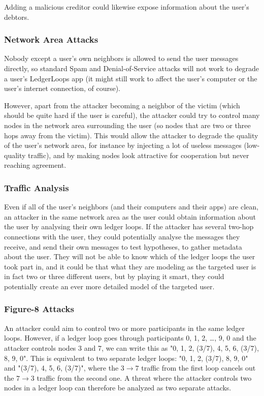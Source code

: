 \documentclass[11pt,twoside,a4paper]{article}
\begin{document}
Adding a malicious creditor could likewise expose information about the user's debtors.

\subsubsection{Network Area Attacks}
Nobody except a user's own neighbors is allowed to send the user messages directly, so standard Spam and Denial-of-Service attacks will not work to degrade a user's LedgerLoops app (it might still work to affect the user's computer or the user's internet connection, of course).

However, apart from the attacker becoming a neighbor of the victim (which should be quite hard if the user is careful), the attacker could try to control many nodes in the network area surrounding the user (so nodes that are two or three hops away from the victim). This would allow the attacker to degrade the quality of the user's network area,
for instance by injecting a lot of useless messages (low-quality traffic), and by making nodes look attractive for cooperation but never reaching agreement.

\subsubsection{Traffic Analysis}
Even if all of the user's neighbors (and their computers and their apps) are clean, an attacker in the same network area as the user could obtain information about the user by analysing their own ledger loops. If the attacker has several two-hop connections with the user, they could potentially analyse the messages they receive, and send their own messages to test hypotheses, to gather metadata about the user. They will not be able to know which of the ledger loops the user took part in, and it could be that what they are modeling as the targeted user is in fact two or three different users, but by playing it smart, they could potentially create an ever more detailed model of the targeted user.

\subsubsection{Figure-8 Attacks}
An attacker could aim to control two or more participants in the same ledger loops. However, if a ledger loop goes through participants 0, 1, 2, \ldots, 9, 0 and the attacker controls nodes 3 and 7, we can write this as "0, 1, 2, (3/7), 4, 5, 6, (3/7), 8, 9, 0". This is equivalent to two separate ledger loops: "0, 1, 2, (3/7), 8, 9, 0" and "(3/7), 4, 5, 6, (3/7)", where the $3 \rightarrow 7$ traffic from the first loop cancels out the $7 \rightarrow 3$ traffic from the second one. A threat where the attacker controls two nodes in a ledger loop can therefore be analyzed as two separate attacks.
\end{document}
